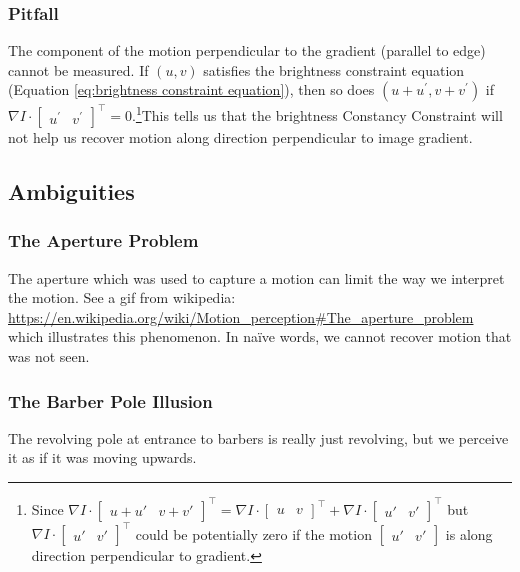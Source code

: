 \documentclass[11pt]{article}
\begin{document}
\subsubsection{Pitfall} The component of the motion perpendicular to the gradient (parallel to edge) cannot be measured. If $(u, v)$ satisfies the brightness constraint equation (Equation \ref{eq:brightness constraint equation}), then so does $\left(u+u^{\prime}, v+v^{\prime}\right)$ if $\nabla I \cdot\left[\begin{array}{ll}
u^{\prime} & 
v^{\prime}
\end{array}\right]^\top =0$.\footnote{Since $\nabla I \cdot \begin{bmatrix}
	u + u' & v + v'
\end{bmatrix}^\top = \nabla I \cdot \begin{bmatrix}
	u  & v 
\end{bmatrix}^\top + \nabla I \cdot \begin{bmatrix}
	u' & v'
\end{bmatrix}^\top$ but $\nabla I \cdot \begin{bmatrix}
	u' & v'
\end{bmatrix}^\top$ could be potentially zero if the motion $\begin{bmatrix}
	u' & v'
\end{bmatrix}$ is along direction perpendicular to gradient. }This tells us that the brightness Constancy Constraint will not help us recover motion along direction perpendicular to image gradient. 

\subsection{Ambiguities}
\subsubsection{The Aperture Problem}
The aperture which was used to capture a motion can limit the way we interpret the motion. See a gif from wikipedia: \url{https://en.wikipedia.org/wiki/Motion_perception#The_aperture_problem} which illustrates this phenomenon. In na\"ive words, we cannot recover motion that was not seen. 

\subsubsection{The Barber Pole Illusion}
The revolving pole at entrance to barbers is really just revolving, but we perceive it as if it was moving upwards. 
\end{document}
